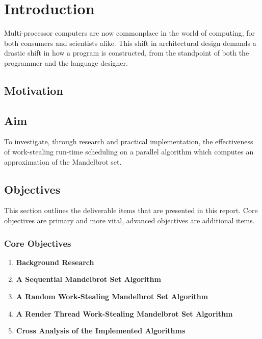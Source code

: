 \chapter{Introduction}


Multi-processor computers are now commonplace in the world of computing, for both consumers and scientists alike. 
This shift in architectural design demands a drastic shift in how a program is constructed, from the standpoint of both
the programmer and the language designer.

\section*{Motivation}



\section*{Aim}

To investigate, through research and practical implementation, the effectiveness of work-stealing run-time scheduling on
a parallel algorithm which computes an approximation of the Mandelbrot set.

\section*{Objectives}
This section outlines the deliverable items that are presented in this report.
Core objectives are primary and more vital, advanced objectives are additional items.

\subsection*{Core Objectives}
\begin{enumerate}
\item \textbf{Background Research}
\item \textbf{A Sequential Mandelbrot Set Algorithm}
\item \textbf{A Random Work-Stealing Mandelbrot Set Algorithm}
\item \textbf{A Render Thread Work-Stealing Mandelbrot Set Algorithm}
\item \textbf{Cross Analysis of the Implemented Algorithms}
\setcounter{saveenum}{\value{enumi}}
\end{enumerate}

